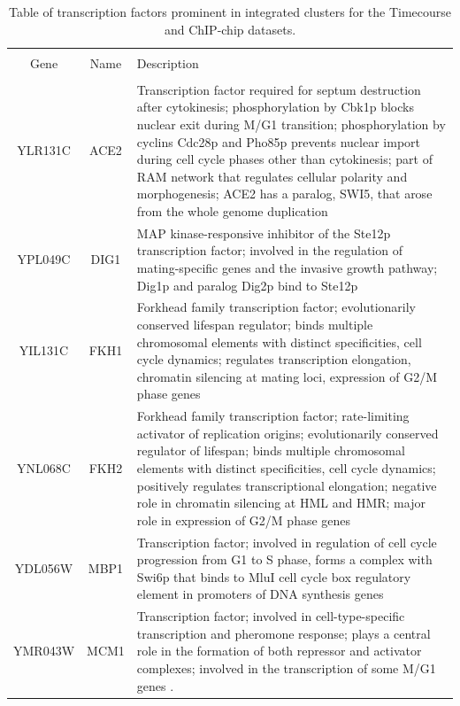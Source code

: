\documentclass[]{article}
\begin{document}
	\begin{longtable}{@{\extracolsep{3pt}} ccp{85mm}} 
	\caption{Table of transcription factors prominent in integrated clusters for the Timecourse and ChIP-chip datasets.}
	\\[-1.8ex]\hline 
	\hline \\[-1.8ex] 
	Gene & Name & Description \\ 
	\hline \\[-1.8ex] 
		YLR131C & ACE2 & Transcription factor required for septum destruction after cytokinesis; phosphorylation by Cbk1p blocks nuclear exit during M/G1 transition; phosphorylation by cyclins Cdc28p and Pho85p prevents nuclear import during cell cycle phases other than cytokinesis; part of RAM network that regulates cellular polarity and morphogenesis; ACE2 has a paralog, SWI5, that arose from the whole genome duplication \\ 
		YPL049C & DIG1 & MAP kinase-responsive inhibitor of the Ste12p transcription factor; involved in the regulation of mating-specific genes and the invasive growth pathway; Dig1p and paralog Dig2p bind to Ste12p
		\\ 
		YIL131C & FKH1 & Forkhead family transcription factor; evolutionarily conserved lifespan regulator; binds multiple chromosomal elements with distinct specificities, cell cycle dynamics; regulates transcription elongation, chromatin silencing at mating loci, expression of G2/M phase genes \\ 
		YNL068C & FKH2 & Forkhead family transcription factor; rate-limiting activator of replication origins; evolutionarily conserved regulator of lifespan; binds multiple chromosomal elements with distinct specificities, cell cycle dynamics; positively regulates transcriptional elongation; negative role in chromatin silencing at HML and HMR; major role in expression of G2/M phase genes \\ 
		YDL056W & MBP1 & Transcription factor; involved in regulation of cell cycle progression from G1 to S phase, forms a complex with Swi6p that binds to MluI cell cycle box regulatory element in promoters of DNA synthesis genes \\ 
		YMR043W & MCM1 & Transcription factor; involved in cell-type-specific transcription and pheromone response; plays a central role in the formation of both repressor and activator complexes; involved in the transcription of some M/G1 genes \cite{simon2001serial}.  \\ 

\end{longtable}
\end{document}
